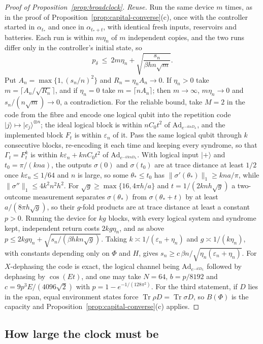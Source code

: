 \documentclass[11pt]{article}
\theoremstyle{definition}
\theoremstyle{remark}
\newcommand{\Tr}{\operatorname{Tr}}
\begin{document}
\begin{proof}[Proof of Proposition~\ref{prop:broadclock}]
\emph{Reuse.} Run the same device $m$ times, as in the proof of Proposition~\ref{prop:capital-converse}(c), once with the controller started in $\alpha_{t_*}$ and once in $\alpha_{t_*+t}$, with identical fresh inputs, reservoirs and batteries. Each run is within $m\eta_n$ of $m$ independent copies, and the two runs differ only in the controller's initial state, so
\[
p_\delta\ \le\ 2m\eta_n+\sqrt{\frac{s_n}{\beta hn\sqrt m}}.
\]
Put $A_n=\max\{1,(s_n/n)^2\}$ and $R_n=\eta_nA_n\to0$. If $\eta_n>0$ take $m=\lceil A_n/\sqrt{R_n}\rceil$, and if $\eta_n=0$ take $m=\lceil nA_n\rceil$; then $m\to\infty$, $m\eta_n\to0$ and $s_n/(n\sqrt m)\to0$, a contradiction. For the reliable bound, take $M=2$ in the code from the fibre and encode one logical qubit into the repetition code $|j\rangle\mapsto|c_j\rangle^{\otimes n}$; the ideal logical block is within $nC_0t^2$ of $\mathrm{Ad}_{e^{-itnD_L}}$, and the implemented block $F_t$ is within $\varepsilon_n$ of it. Pass the same logical qubit through $k$ consecutive blocks, re-encoding it each time and keeping every syndrome, so that $\Gamma_t=F_t^k$ is within $k\varepsilon_n+knC_0t^2$ of $\mathrm{Ad}_{e^{-itknD_L}}$. With logical input $|+\rangle$ and $t_0=\pi/(kna)$, the outputs $\sigma(0)$ and $\sigma(t_0)$ are at trace distance at least $1/2$ once $k\varepsilon_n\le1/64$ and $n$ is large, so some $\theta_*\le t_0$ has $\|\sigma'(\theta_*)\|_1\ge kna/\pi$, while $\|\sigma''\|_1\le4k^2n^2h^2$. For $\sqrt g\ge\max\{16,4\pi h/a\}$ and $t=1/(2knh\sqrt g)$ a two-outcome measurement separates $\sigma(\theta_*)$ from $\sigma(\theta_*+t)$ by at least $a/(8\pi h\sqrt g)$, so their $g$-fold products are at trace distance at least a constant $p>0$. Running the device for $kg$ blocks, with every logical system and syndrome kept, independent return costs $2kg\eta_n$, and as above $p\le2kg\eta_n+\sqrt{s_n/(\beta hkn\sqrt g)}$. Taking $k\asymp1/(\varepsilon_n+\eta_n)$ and $g\asymp1/(k\eta_n)$, with constants depending only on $\Phi$ and $H$, gives $s_n\ge c\,\beta n/\sqrt{\eta_n(\varepsilon_n+\eta_n)}$. For $X$-dephasing the code is exact, the logical channel being $\mathrm{Ad}_{e^{-itD_L}}$ followed by dephasing by $\cos(Et)$, and one may take $N=64$, $b=p/8192$ and $c=9p^3E/(4096\sqrt2)$ with $p=1-e^{-1/(128\pi^2)}$. For the third statement, if $D$ lies in the span, equal environment states force $\Tr\rho D=\Tr\sigma D$, so $B(\Phi)$ is the capacity and Proposition~\ref{prop:capital-converse}(c) applies.
\end{proof}

\subsection{How large the clock must be}\label{pf:clocksize}
\end{document}

